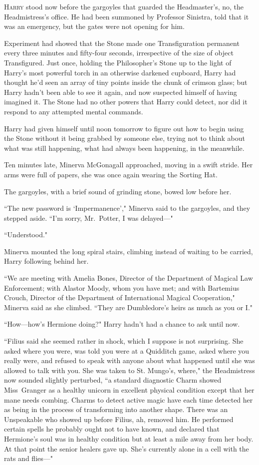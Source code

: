 
\lettrine{H}{arry} stood now before the gargoyles that guarded the Headmaster's, no, the Headmistress's office. He had been summoned by Professor Sinistra, told that it was an emergency, but the gates were not opening for him.

Experiment had showed that the Stone made one Transfiguration permanent every three minutes and fifty-four seconds, irrespective of the size of object Transfigured. Just once, holding the Philosopher's Stone up to the light of Harry's most powerful torch in an otherwise darkened cupboard, Harry had thought he'd seen an array of tiny points inside the chunk of crimson glass; but Harry hadn't been able to see it again, and now suspected himself of having imagined it. The Stone had no other powers that Harry could detect, nor did it respond to any attempted mental commands.

Harry had given himself until noon tomorrow to figure out how to begin using the Stone without it being grabbed by someone else, trying not to think about what was still happening, what had always been happening, in the meanwhile.

Ten minutes late, Minerva McGonagall approached, moving in a swift stride. Her arms were full of papers, she was once again wearing the Sorting Hat.

The gargoyles, with a brief sound of grinding stone, bowed low before her.

``The new password is `Impermanence'," Minerva said to the gargoyles, and they stepped aside. ``I'm sorry, Mr.~Potter, I was delayed---"

``Understood."

Minerva mounted the long spiral stairs, climbing instead of waiting to be carried, Harry following behind her.

``We are meeting with Amelia Bones, Director of the Department of Magical Law Enforcement; with Alastor Moody, whom you have met; and with Bartemius Crouch, Director of the Department of International Magical Cooperation," Minerva said as she climbed. ``They are Dumbledore's heirs as much as you or I."

``How---how's Hermione doing?" Harry hadn't had a chance to ask until now.

``Filius said she seemed rather in shock, which I suppose is not surprising. She asked where you were, was told you were at a Quidditch game, asked where you really were, and refused to speak with anyone about what happened until she was allowed to talk with you. She was taken to St. Mungo's, where," the Headmistress now sounded slightly perturbed, ``a standard diagnostic Charm showed Miss~Granger as a healthy unicorn in excellent physical condition except that her mane needs combing. Charms to detect active magic have each time detected her as being in the process of transforming into another shape. There was an Unspeakable who showed up before Filius, ah, removed him. He performed certain spells he probably ought not to have known, and declared that Hermione's soul was in healthy condition but at least a mile away from her body. At that point the senior healers gave up. She's currently alone in a cell with the rats and flies---"

